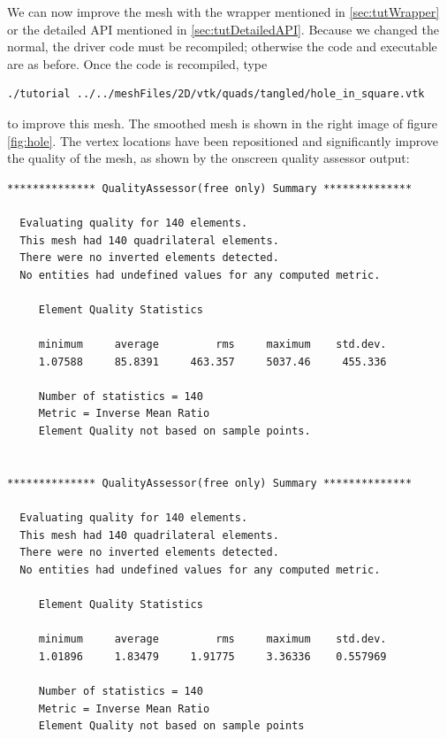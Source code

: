 We can now improve the mesh with the wrapper mentioned in
\ref{sec:tutWrapper} or the detailed API mentioned in
\ref{sec:tutDetailedAPI}.
Because we changed the normal, the driver code must be recompiled;
otherwise the code and executable are as before.
Once the code is recompiled, type
\begin{verbatim}
./tutorial ../../meshFiles/2D/vtk/quads/tangled/hole_in_square.vtk
\end{verbatim}
to improve this mesh.
The smoothed mesh is shown in the right image of figure
\ref{fig:hole}.
The vertex locations have been repositioned and significantly improve
the quality of the mesh, as shown by the onscreen
quality assessor output:
\begin{verbatim}
************** QualityAssessor(free only) Summary **************

  Evaluating quality for 140 elements.
  This mesh had 140 quadrilateral elements.
  There were no inverted elements detected.
  No entities had undefined values for any computed metric.

     Element Quality Statistics

     minimum     average         rms     maximum    std.dev.
     1.07588     85.8391     463.357     5037.46     455.336

     Number of statistics = 140
     Metric = Inverse Mean Ratio
     Element Quality not based on sample points.


************** QualityAssessor(free only) Summary **************

  Evaluating quality for 140 elements.
  This mesh had 140 quadrilateral elements.
  There were no inverted elements detected.
  No entities had undefined values for any computed metric.

     Element Quality Statistics

     minimum     average         rms     maximum    std.dev.
     1.01896     1.83479     1.91775     3.36336    0.557969

     Number of statistics = 140
     Metric = Inverse Mean Ratio
     Element Quality not based on sample points
\end{verbatim}
